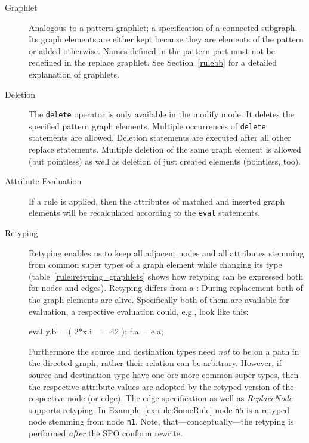 \begin{description}
  \item[Graphlet] Analogous to a pattern graphlet; a specification of a connected subgraph. Its graph elements are either kept because they are elements of the pattern or added otherwise. Names defined in the pattern part must not be redefined in the replace graphlet. See Section~\ref{rulebb} for a detailed explanation of graphlets. 
  \item[Deletion] The \texttt{delete} operator is only available in the modify mode. It deletes the specified pattern graph elements. Multiple occurrences of \texttt{delete} statements are allowed. Deletion statements are executed after all other replace statements. Multiple deletion of the same graph element is allowed (but pointless) as well as deletion of just created elements (pointless, too).
  \item[Attribute Evaluation] If a rule is applied, then the attributes of matched and inserted graph elements will be recalculated according to the \texttt{eval} statements.
  \item[Retyping] Retyping enables us to keep all adjacent nodes and all attributes stemming from common super types of a graph element while changing its type (table~\ref{rule:retyping_graphlets} shows how retyping can be expressed both for nodes and edges).
  Retyping differs from a : During replacement both of the graph elements are alive.
  Specifically both of them are available for evaluation, a respective evaluation could, e.g., look like this:
  \begin{grgenlet}
eval {
  y.b = ( 2*x.i == 42 );
  f.a = e.a;
}
  \end{grgenlet}
  Furthermore the source and destination types need \emph{not} to be on a path in the directed  graph, rather their relation can be arbitrary.
  However, if source and destination type have one ore more common super types, then the respective attribute values are adopted by the retyped version of the respective node (or edge).
  The edge specification as well as \emph{ReplaceNode} supports retyping. 
  In Example~\ref{ex:rule:SomeRule} node \texttt{n5} is a retyped node stemming from node \texttt{n1}.
  Note, that---conceptually---the retyping is performed \emph{after} the SPO conform rewrite.
\end{description} 

